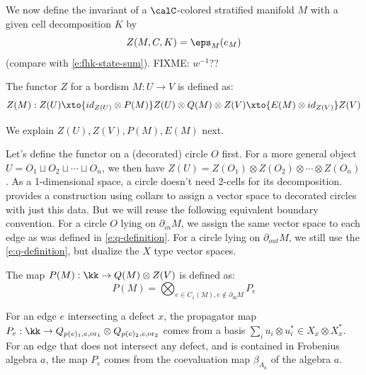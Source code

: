 \begin{defectfiguresetup}
We now define the invariant of a $\calC$-colored stratified manifold $M$
with a given cell decomposition $K$ by
\begin{equation}\label{e:defect-state-sum}
  Z(M,C,K)=\eps_M (e_M)
\end{equation}
(compare with \eqref{e:fhk-state-sum}). FIXME: $w^{-1}$??


The functor $Z$ for a bordism $M:U\rightarrow V$ is defined as:
\begin{equation}
	Z(M) : Z(U) \xto{id_{Z(U)} \otimes P(M)} Z(U) \otimes Q(M) \otimes Z(V) \xto{E(M) \otimes id_{Z(V)}} Z(V)
\end{equation}

We explain $Z(U), Z(V), P(M), E(M)$ next.


Let's define the functor on a (decorated) circle $O$ first. For a more general object $U=O_1 \sqcup O_2 \sqcup \cdots \sqcup O_n$, we then have $Z(U)=Z(O_1)\otimes Z(O_2) \otimes \cdots \otimes Z(O_n)$. As a 1-dimensional space, a circle doesn't need 2-cells for its decomposition.  \cite[Section 2.3]{dkr} provides a construction using collars to assign a vector space to decorated circles with just this data. But we will reuse the following equivalent boundary convention. For a circle $O$ lying on $\partial_{in} M$, we assign the same vector space to each edge as was defined in \eqref{e:q-definition}. For a circle lying on $\partial_{out} M$, we still use the \eqref{e:q-definition}, but dualize the $X$ type vector spaces.

The map $P(M): \kk \rightarrow Q(M) \otimes Z(V)$ is defined as:
\begin{equation}
	P(M) = \bigotimes_{e \in C_1(M), e \notin \partial_{\mathrm{in}} M} P_e
\end{equation}

For an edge $e$ intersecting a defect $x$, the propagator map $P_e: \kk \rightarrow Q_{p(e)_1,e,\mathrm{or}_1} \otimes Q_{p(e)_2,e,\mathrm{or}_2}$ comes from a basis $\sum_{i} u_i \otimes u_i^* \in X_x \otimes X_x^*$. For an edge that does not intersect any defect, and is contained in Frobenius algebra $a$, the map $P_e$ comes from the coevaluation map $\beta_{A_a}$ of the algebra $a$.


\end{defectfiguresetup}
